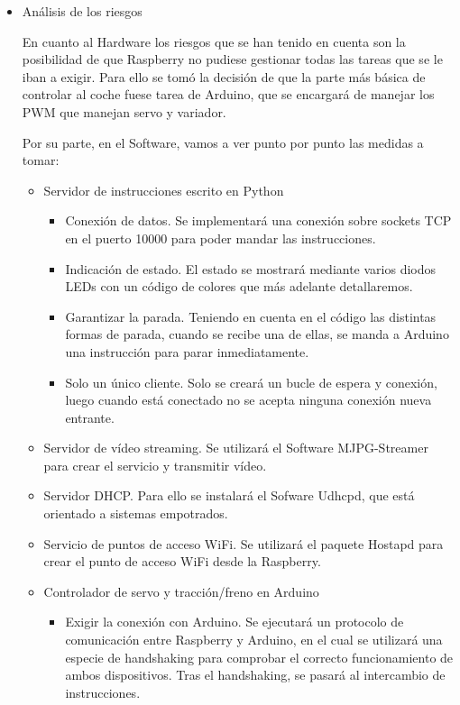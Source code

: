 \documentclass{pclass}
\begin{document}
\begin{itemize}
	\item Análisis de los riesgos
		
	En cuanto al Hardware los riesgos que se han tenido en cuenta son la posibilidad de que Raspberry no pudiese gestionar todas las tareas que se le iban a exigir. Para ello se tomó la decisión de que la parte más básica de controlar al coche fuese tarea de Arduino, que se encargará de manejar los PWM que manejan servo y variador.
	
	Por su parte, en el Software, vamos a ver punto por punto las medidas a tomar:
	
	\begin{itemize}
		\item Servidor de instrucciones escrito en Python
		\begin{itemize}
			\item Conexión de datos. Se implementará una conexión sobre sockets TCP en el puerto 10000 para poder mandar las instrucciones.
			\item Indicación de estado. El estado se mostrará mediante varios diodos LEDs con un código de colores que más adelante detallaremos.
			\item Garantizar la parada. Teniendo en cuenta en el código las distintas formas de parada, cuando se recibe una de ellas, se manda a Arduino una instrucción para parar inmediatamente.
			\item Solo un único cliente. Solo se creará un bucle de espera y conexión, luego cuando está conectado no se acepta ninguna conexión nueva entrante.
		\end{itemize}
		\item Servidor de vídeo streaming. Se utilizará el Software MJPG-Streamer para crear el servicio y transmitir vídeo.
		\item Servidor DHCP. Para ello se instalará el Sofware Udhcpd, que está orientado a sistemas empotrados.
		\item Servicio de puntos de acceso WiFi. Se utilizará el paquete Hostapd para crear el punto de acceso WiFi desde la Raspberry.
		\item Controlador de servo y tracción/freno en Arduino
		\begin{itemize}
			\item Exigir la conexión con Arduino. Se ejecutará un protocolo de comunicación entre Raspberry y Arduino, en el cual se utilizará una especie de handshaking para comprobar el correcto funcionamiento de ambos dispositivos. Tras el handshaking, se pasará al intercambio de instrucciones.

\end{itemize}
\end{itemize}
\end{itemize}
\end{document}
